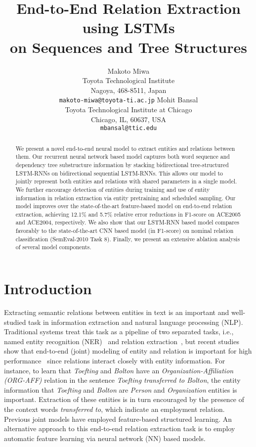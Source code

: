 \documentclass[11pt]{article}
\title{End-to-End Relation Extraction using LSTMs \\ on Sequences and Tree Structures}
\author{Makoto Miwa\\
	    Toyota Technological Institute \\
	    Nagoya, 468-8511, Japan\\
	    {\tt makoto-miwa@toyota-ti.ac.jp}
	  \And
	Mohit Bansal\\
  	Toyota Technological Institute at Chicago \\ Chicago, IL, 60637, USA\\
  {\tt mbansal@ttic.edu}}
\date{}
\begin{document}
\maketitle

\begin{abstract}
We present a novel end-to-end neural model to extract entities and relations between them. Our recurrent neural network based model captures both word sequence and dependency tree substructure information by stacking bidirectional tree-structured LSTM-RNNs on bidirectional sequential LSTM-RNNs. This allows our model to jointly represent both entities and relations with shared parameters in a single model. We further encourage detection of entities during training and use of entity information in relation extraction via entity pretraining and scheduled sampling. Our model improves over the state-of-the-art feature-based model on end-to-end relation extraction, achieving 12.1\% and 5.7\% relative error reductions in F1-score on ACE2005 and ACE2004, respectively. 
We also show that our LSTM-RNN based model compares favorably to the state-of-the-art CNN based model (in F1-score) on nominal relation classification (SemEval-2010 Task 8). Finally, we present an extensive ablation analysis of several model components.
\end{abstract}

\section{Introduction}

Extracting semantic relations between entities in text is an important and well-studied task in information extraction and natural language processing (NLP). 
Traditional systems treat this task as a pipeline of two separated tasks, i.e., named entity recognition (NER)~\cite{nadeau2007survey,ratinov-roth:2009:CoNLL} and relation extraction~\cite{zelenko2003kernel,zhou-EtAl:2005:ACL}, but recent studies show that end-to-end (joint) modeling of entity and relation is important for high performance~\cite{li-ji:2014:P14-1,miwa-sasaki:2014:EMNLP2014} since relations interact closely with entity information. For instance, to learn that {\it Toefting} and {\it Bolton} have an {\it Organization-Affiliation (ORG-AFF)} relation in the sentence {\it Toefting transferred to Bolton}, the entity information that {\it Toefting} and {\it Bolton} are {\it Person} and {\it Organization} entities is important. Extraction of these entities is in turn encouraged by the presence of the context words {\it transferred to}, which indicate an employment relation.
Previous joint models have employed feature-based structured learning. An alternative approach to this end-to-end relation extraction task is to employ automatic feature learning via neural network (NN) based models. 
\end{document}
